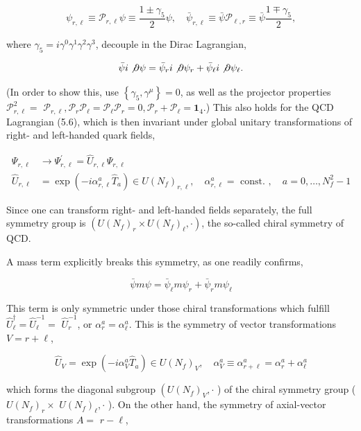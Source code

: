 \documentclass[10pt, letterpaper]{article}
\begin{document}
$$
\psi_{r, \ell} \equiv \mathcal{P}_{r, \ell} \psi \equiv \frac{1 \pm \gamma_{5}}{2} \psi, \quad \bar{\psi}_{r, \ell} \equiv \bar{\psi} \mathcal{P}_{\ell, r} \equiv \bar{\psi} \frac{1 \mp \gamma_{5}}{2},
$$

where $\gamma_{5}=i \gamma^{0} \gamma^{1} \gamma^{2} \gamma^{3}$, decouple in the Dirac Lagrangian,

$$
\bar{\psi} i \not \partial \psi=\bar{\psi}_{r} i \not \partial \psi_{r}+\bar{\psi}_{\ell} i \not \partial \psi_{\ell} .
$$

(In order to show this, use $\left\{\gamma_{5}, \gamma^{\mu}\right\}=0$, as well as the projector properties $\mathcal{P}_{r, \ell}^{2}=$ $\mathcal{P}_{r, \ell}, \mathcal{P}_{r} \mathcal{P}_{\ell}=\mathcal{P}_{\ell} \mathcal{P}_{r}=0, \mathcal{P}_{r}+\mathcal{P}_{\ell}=\mathbf{1}_{4}$.) This also holds for the QCD Lagrangian (5.6), which is then invariant under global unitary transformations of right- and left-handed quark fields,

$$
\begin{aligned}
\Psi_{r, \ell} & \longrightarrow \Psi_{r, \ell}^{\prime}=\hat{U}_{r, \ell} \Psi_{r, \ell} \\
\hat{U}_{r, \ell} & =\exp \left(-i \alpha_{r, \ell}^{a} \hat{T}_{a}\right) \in U\left(N_{f}\right)_{r, \ell}, \quad \alpha_{r, \ell}^{a}=\text { const. }, \quad a=0, \ldots, N_{f}^{2}-1
\end{aligned}
$$

Since one can transform right- and left-handed fields separately, the full symmetry group is $\left(U\left(N_{f}\right)_{r} \times U\left(N_{f}\right)_{\ell}, \cdot\right)$, the so-called chiral symmetry of QCD.

A mass term explicitly breaks this symmetry, as one readily confirms,

$$
\bar{\psi} m \psi=\bar{\psi}_{\ell} m \psi_{r}+\bar{\psi}_{r} m \psi_{\ell}
$$

This term is only symmetric under those chiral transformations which fulfill $\hat{U}_{\ell}^{\dagger}=\hat{U}_{\ell}^{-1}=$ $\hat{U}_{r}^{-1}$, or $\alpha_{r}^{a}=\alpha_{\ell}^{a}$. This is the symmetry of vector transformations $V=r+\ell$,

$$
\hat{U}_{V}=\exp \left(-i \alpha_{V}^{a} \hat{T}_{a}\right) \in U\left(N_{f}\right)_{V}, \quad \alpha_{V}^{a} \equiv \alpha_{r+\ell}^{a}=\alpha_{r}^{a}+\alpha_{\ell}^{a}
$$

which forms the diagonal subgroup $\left(U\left(N_{f}\right)_{V}, \cdot\right.$ ) of the chiral symmetry group ( $U\left(N_{f}\right)_{r} \times$ $U\left(N_{f}\right)_{\ell}, \cdot$ ). On the other hand, the symmetry of axial-vector transformations $A=$ $r-\ell$,
\end{document}
